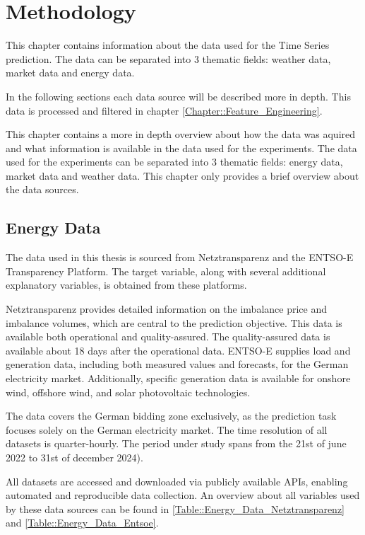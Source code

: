 \documentclass[class=scrbook, crop=false]{standalone}
\begin{document}
\chapter{Methodology} %
\label{Chapter::Methodology}
This chapter contains information about the data used for the Time Series prediction. 
The data can be separated into 3 thematic fields: weather data, market data and energy data.

In the following sections each data source will be described more in depth. 
This data is processed and filtered in chapter \ref{Chapter::Feature_Engineering}.

This chapter contains a more in depth overview about how the data was aquired and what information is available in the data used for the experiments. 
The data used for the experiments can be separated into 3 thematic fields: energy data, market data and weather data.
This chapter only provides a brief overview about the data sources. 

    
\section{Energy Data}
\label{Section::Energy_Data}


The data used in this thesis is sourced from Netztransparenz and the ENTSO-E Transparency Platform.
The target variable, along with several additional explanatory variables, is obtained from these platforms.

Netztransparenz provides detailed information on the imbalance price and imbalance volumes, which are central to the prediction objective.
This data is available both operational and quality-assured.
The quality-assured data is available about 18 days after the operational data. 
ENTSO-E supplies load and generation data, including both measured values and forecasts, for the German electricity market.
Additionally, specific generation data is available for onshore wind, offshore wind, and solar photovoltaic technologies.

The data covers the German bidding zone exclusively, as the prediction task focuses solely on the German electricity market.
The time resolution of all datasets is quarter-hourly.
The period under study spans from the 21st of june 2022 to 31st of december 2024).

All datasets are accessed and downloaded via publicly available APIs, enabling automated and reproducible data collection.
An overview about all variables used by these data sources can be found in \ref{Table::Energy_Data_Netztransparenz} and \ref{Table::Energy_Data_Entsoe}.
\end{document}
